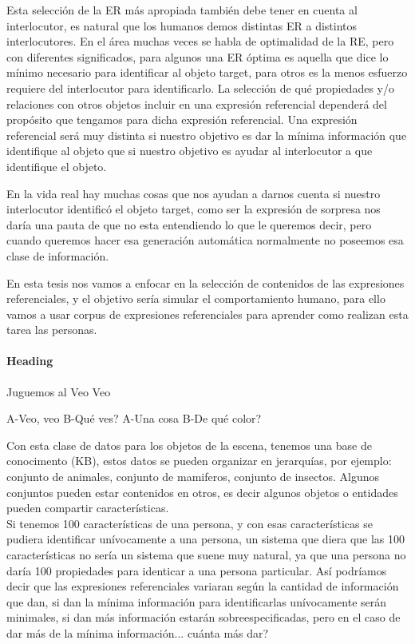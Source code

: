 Esta selecci\'on de la ER m\'as apropiada tambi\'en debe tener en cuenta al interlocutor, es natural que los humanos demos distintas ER a distintos interlocutores. En el \'area muchas veces se habla de optimalidad de la RE, pero con diferentes significados, para algunos una ER \'optima es aquella que dice lo m\'inimo necesario para identificar al objeto target, para otros es la menos esfuerzo requiere del interlocutor para identificarlo.
La selecci\'on de qu\'e propiedades y/o relaciones con otros objetos incluir en una expresi\'on referencial depender\'a del prop\'osito que tengamos para dicha expresi\'on referencial. Una expresi\'on referencial ser\'a muy distinta si nuestro objetivo es dar la m\'inima informaci\'on que identifique al objeto que si nuestro objetivo es ayudar al interlocutor a que identifique el objeto.

En la vida real hay muchas cosas que nos ayudan a darnos cuenta si nuestro interlocutor identific\'o el objeto target, como ser la expresi\'on de sorpresa nos dar\'ia una pauta de que no esta entendiendo lo que le queremos decir, pero cuando queremos hacer esa generaci\'on autom\'atica normalmente no poseemos esa clase de informaci\'on.

En esta tesis nos vamos a enfocar en la selecci\'on de contenidos de las expresiones referenciales, y el objetivo ser\'ia simular el comportamiento humano, para ello vamos a usar corpus de expresiones referenciales para aprender como realizan esta tarea las personas.
 

\paragraph{Heading} Juguemos al Veo Veo

A-Veo, veo
B-Qu\'e ves?
A-Una cosa
B-De qu\'e color?

Con esta clase de datos para los objetos de la escena, tenemos una base de conocimento (KB), estos datos se pueden organizar en jerarqu\'ias, por ejemplo: conjunto de animales, conjunto de mamiferos, conjunto de insectos. Algunos conjuntos pueden estar contenidos en otros, es decir algunos objetos o entidades pueden compartir caracter\'isticas.\\

Si tenemos 100 caracter\'isticas de una persona, y con esas caracter\'isticas se pudiera identificar un\'ivocamente a una persona, un sistema que diera que las 100 caracter\'isticas no ser\'ia un sistema que suene muy natural, ya que una persona no dar\'ia 100 propiedades para identicar a una persona particular. As\'i podr\'iamos decir que las expresiones referenciales variaran seg\'un la cantidad de informaci\'on que dan, si dan la m\'inima informaci\'on para identificarlas un\'ivocamente ser\'an minimales, si dan m\'as informaci\'on estar\'an sobreespecificadas, pero en el caso de dar m\'as de la m\'inima informaci\'on... cu\'anta m\'as dar?\\

